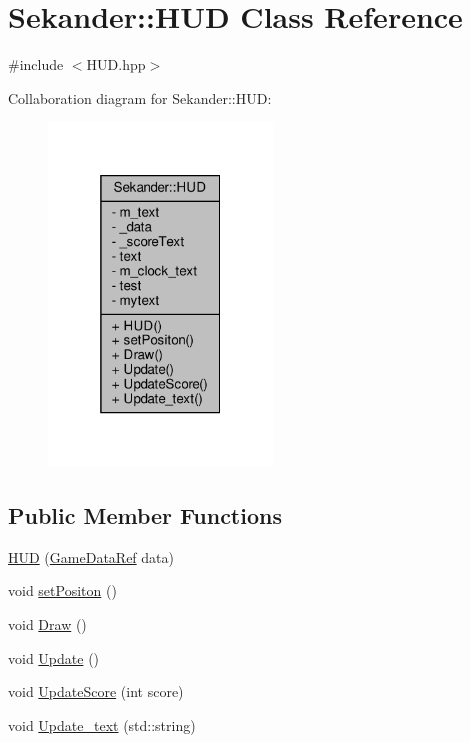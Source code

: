 \hypertarget{classSekander_1_1HUD}{}\section{Sekander\+:\+:H\+UD Class Reference}
\label{classSekander_1_1HUD}


{\ttfamily \#include $<$H\+U\+D.\+hpp$>$}



Collaboration diagram for Sekander\+:\+:H\+UD\+:
\nopagebreak
\begin{figure}[H]
\begin{center}
\leavevmode
\includegraphics[width=169pt]{classSekander_1_1HUD__coll__graph}
\end{center}
\end{figure}
\subsection*{Public Member Functions}
\begin{DoxyCompactItemize}
\item 
\hyperlink{classSekander_1_1HUD_a36e8acd746cc8528c579f9a443433f49}{H\+UD} (\hyperlink{namespaceSekander_a1d69b002ba2d23020901c28f0def5e16}{Game\+Data\+Ref} data)
\item 
void \hyperlink{classSekander_1_1HUD_adae59bd419e3efb72e52039025cc390d}{set\+Positon} ()
\item 
void \hyperlink{classSekander_1_1HUD_a79da321cb1474c30707d744cf2598fda}{Draw} ()
\item 
void \hyperlink{classSekander_1_1HUD_ad94d4fa9b5d08ee9b8759b581fd7bc00}{Update} ()
\item 
void \hyperlink{classSekander_1_1HUD_a1acd603a773e2ccddb08d7e97a658a01}{Update\+Score} (int score)
\item 
void \hyperlink{classSekander_1_1HUD_a485d26aab99f64815832644f0fba8057}{Update\+\_\+text} (std\+::string)
\end{DoxyCompactItemize}
